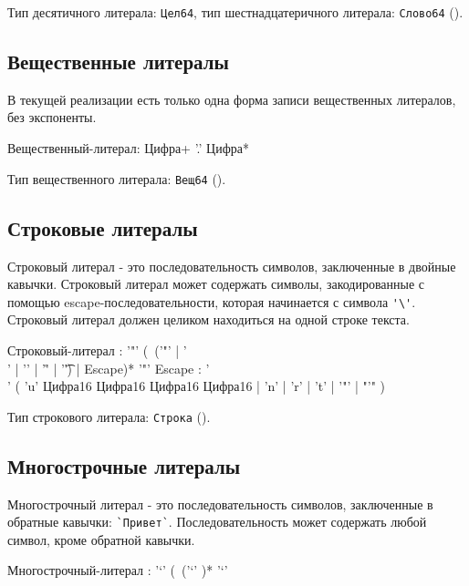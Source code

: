 Тип десятичного литерала: \verb+Цел64+, тип шестнадцатеричного литерала: \verb+Слово64+ (). 

\hypertarget{floatlit}{%
\subsection{Вещественные литералы}\label{lex:floatlit}}

В текущей реализации есть только одна форма записи вещественных литералов, без экспоненты.

\begin{Grammar}
Вещественный-литерал: Цифра+ '.' Цифра*
\end{Grammar}      

Тип вещественного литерала: \verb+Вещ64+ (). 

\hypertarget{strlit}{%
\subsection{Строковые литералы}\label{lex:strlit}}

Строковый литерал - это последовательность символов, заключенные в двойные кавычки. Строковый литерал может содержать символы, закодированные с помощью escape-последовательности, которая начинается с символа \verb+'\'+. Строковый литерал должен целиком находиться на одной строке текста.

\begin{Grammar}
Строковый-литерал
    : '"'
    (~('"' | '\\' | '\n' | '\r' | '\t') | Escape)* 
    '"' 
Escape
    : '\\'
    ( 'u' Цифра16 Цифра16 Цифра16 Цифра16
    | 'n' | 'r' | 't' 
    | '"'
    | "'"
    )
\end{Grammar}  

Тип строкового литерала: \verb+Строка+ (). 

\hypertarget{multistrlit}{%
\subsection{Многострочные литералы}\label{lex:multistrlit}}

Многострочный литерал - это последовательность символов, заключенные в обратные кавычки:  \verb+`Привет`+. 
Последовательность может содержать любой символ, кроме обратной кавычки.

\begin{Grammar}
Многострочный-литерал
    : '`' (~('`' )* '`' 
\end{Grammar}  

